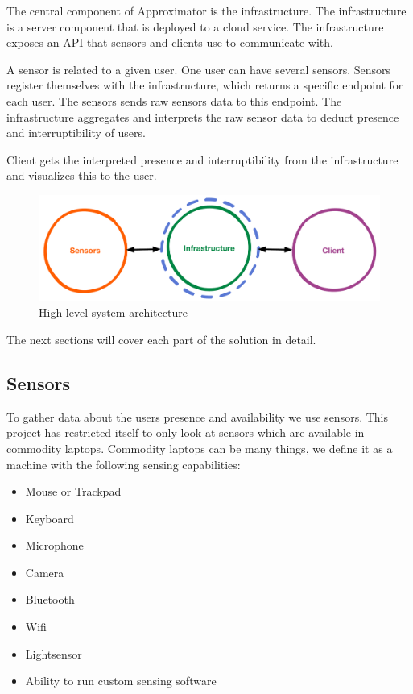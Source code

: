 \documentclass{sigchi}
\begin{document}
The central component of Approximator is the infrastructure.
The infrastructure is a server component that is deployed to a cloud service.
The infrastructure exposes an API that sensors and clients use to communicate with.

A sensor is related to a given user.
One user can have several sensors.
Sensors register themselves with the infrastructure, which returns a specific endpoint for each user.
The sensors sends raw sensors data to this endpoint.
The infrastructure aggregates and interprets the raw sensor data to deduct presence and interruptibility of users.

Client gets the interpreted presence and interruptibility from the infrastructure and visualizes this to the user.

\begin{figure}[H]
  \centering
  \includegraphics[width=\columnwidth]{figures/system_architecture.pdf}
  \caption{High level system architecture}
  \label{fig:architecture}
\end{figure}

The next sections will cover each part of the solution in detail.

\subsection{Sensors}
To gather data about the users presence and availability we use sensors.
This project has restricted itself to only look at sensors which are available in commodity laptops.
Commodity laptops can be many things, we define it as a machine with the following sensing capabilities:
\begin{itemize}
  \item Mouse or Trackpad
  \item Keyboard
  \item Microphone
  \item Camera
  \item Bluetooth
  \item Wifi
  \item Lightsensor
  \item Ability to run custom sensing software
\end{itemize}
\end{document}
